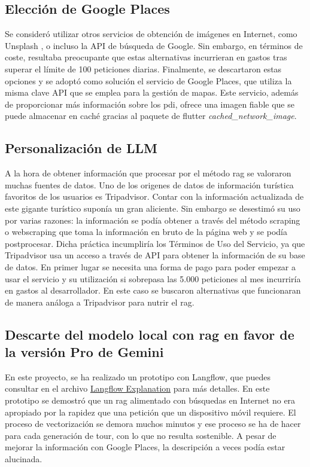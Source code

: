 \subsection{Elección de Google Places}
Se consideró utilizar otros servicios de obtención de imágenes en Internet, como Unsplash \cite{unsplash}, o incluso la API de búsqueda de Google. Sin embargo, en términos de coste, resultaba preocupante que estas alternativas incurrieran en gastos tras superar el límite de 100 peticiones diarias. Finalmente, se descartaron estas opciones y se adoptó como solución el servicio de Google Places, que utiliza la misma clave API que se emplea para la gestión de mapas. Este servicio, además de proporcionar más información sobre los \acrlong{pdi}, ofrece una imagen fiable que se puede almacenar en caché gracias al paquete de flutter \textit{cached\_network\_image}.

\subsection{Personalización de LLM}
A la hora de obtener información que procesar por el método \acrshort{rag} se valoraron muchas fuentes de datos. Uno de los origenes de datos de información turística favoritos de los usuarios es Tripadvisor. Contar con la información actualizada de este gigante turístico suponía un gran aliciente. Sin embargo se desestimó su uso por varias razones: la información se podía obtener a través del método scraping o webscraping que toma la información en bruto de la página web y se podía postprocesar. Dicha práctica incumpliría los Términos de Uso del Servicio, ya que Tripadvisor usa un acceso a través de API para obtener la información de su base de datos. En primer lugar se necesita una forma de pago para poder empezar a usar el servicio y su utilización si sobrepasa las 5.000 peticiones al mes incurriría en gastos al desarrollador. En este caso se buscaron alternativas que funcionaran de manera análoga a Tripadvisor para nutrir el \acrshort{rag}.

\subsection{Descarte del modelo local con \acrshort{rag} en favor de la versión Pro de Gemini}

En este proyecto, se ha realizado un prototipo con Langflow, que puedes consultar en el archivo \href{https://github.com/fps1001/TFGII_FPisot/blob/main/project-prototypes/Langflow_explanation.md}{Langflow Explanation} para más detalles. En este prototipo se 
demostró que un \acrshort{rag} alimentado con búsquedas en Internet no era apropiado por la rapidez que una petición que un dispositivo móvil requiere. El proceso de vectorización se demora muchos minutos y ese proceso se ha de hacer para cada generación de tour, con lo que no resulta sostenible. A pesar de mejorar la información con Google Places, la descripción a veces podía estar alucinada. 

